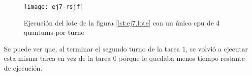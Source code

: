   \begin{figure}[H]
  		\centering
  		\texttt{[image: ej7-rsjf]}
  		\caption{Ejecución del lote de la figura \ref{lst:ej7.lote} con un \'unico cpu de 4 quantums por turno}
  		\label{fig:ej7.rsjf}
  \end{figure}

  Se puede ver que, al terminar el segundo turno de la tarea $1$, se volvió a ejecutar esta misma tarea en vez de la tarea $0$ porque le quedaba menos tiempo restante de ejecución.

